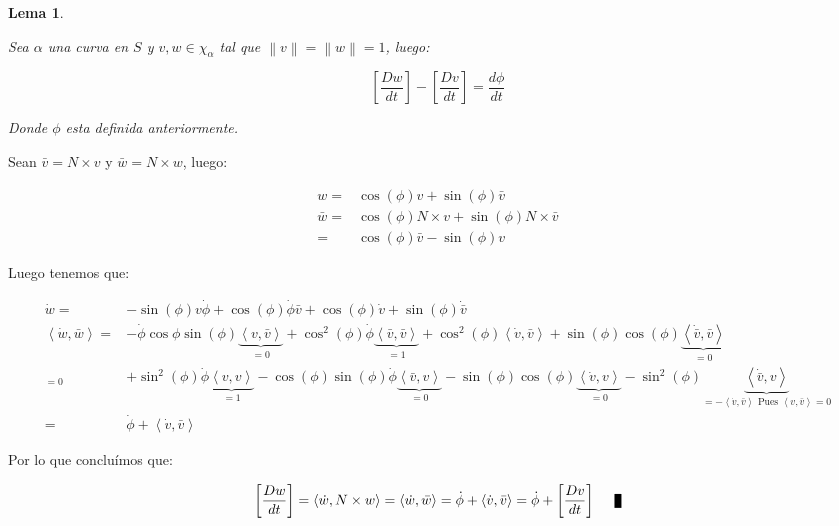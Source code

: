 \documentclass[11pt]{article}
\newcommand\norm[1]{\left\lVert#1\right\rVert}
\newcommand\ip[1]{\left\langle#1\right\rangle}
\newtheorem{lemma}[theorem]{Lema}
\newenvironment{proof}[1][Demostraci\'on]{\begin{trivlist}
		\item[\hskip \labelsep {\bfseries #1}]}{\end{trivlist}}
\newcommand{\qed}{\nobreak \ifvmode \relax \else
	\ifdim\lastskip<1.5em \hskip-\lastskip
	\hskip1.5em plus0em minus0.5em \fi \nobreak
	\vrule height0.75em width0.5em depth0.25em\fi}
\begin{document}
\begin{lemma}
	\label{Derivada covariante y angulo}
	
	Sea $\alpha$ una curva en $S$ y $v,w \in \chi_{\alpha}$ tal que $\norm{v} = \norm{w} = 1$, luego:
	
	\begin{equation*}
		\left[\dfrac{Dw}{dt}\right] - \left[\dfrac{Dv}{dt}\right] = \dfrac{d\phi}{dt}
	\end{equation*}
	
	Donde $\phi$ esta definida anteriormente.
	
\end{lemma}

\begin{proof}
	
	Sean $\bar{v} = N \times v$ y $\bar{w} = N \times w$, luego:
	
	\begin{equation*}
		\begin{aligned}
			w = & \cos(\phi)v + \sin(\phi) \bar{v} \\
			\bar{w} = & \cos(\phi)N \times v + \sin(\phi) N \times \bar{v} \\
			= & \cos(\phi) \bar{v} - \sin(\phi) v 
		\end{aligned}
	\end{equation*}
	
	Luego tenemos que:
	
	\begin{equation*}
	\begin{aligned}
		\dot{w} = & - \sin(\phi)v \dot{\phi} + \cos(\phi) \dot{\phi}\bar{v} + \cos(\phi)\dot{v} + \sin(\phi) \dot{\bar{v}} \\
		\ip{\dot{w},\bar{w}} = & -\dot{\phi} \cos{\phi} \sin(\phi) \underbrace{\ip{v,\bar{v}}}_{= 0} + \cos^2(\phi) \dot{\phi} \underbrace{\ip{\bar{v}, \bar{v}}}_{= 1}  + \cos^2(\phi) \ip{\dot{v}, \bar{v}} + \sin(\phi)\cos(\phi) \underbrace{\ip{\dot{\bar{v}}, \bar{v}}}_{= 0}  \\_{= 0} 
		& + \sin^2(\phi) \dot{\phi}  \underbrace{\ip{v,v} }_{= 1} - \cos(\phi)\sin(\phi) \dot{\phi} \underbrace{\ip{\bar{v},v} }_{=0}- \sin(\phi)\cos(\phi) \underbrace{\ip{\dot{v},v} }_{= 0} - \sin^2(\phi) \underbrace{\ip{\dot{\bar{v}},v}}_{ = -\ip{\dot{v},\bar{v}} \text{ Pues } \ip{v, \bar{v}} = 0} \\
		= & \dot{\phi} + \ip{\dot{v},\bar{v}}
	\end{aligned}
	\end{equation*}
	
	Por lo que conclu\'imos que:
	
	\begin{equation*}
	 \left[\dfrac{Dw}{dt}\right] = \ip{\dot{w} , N \times w} = \ip{\dot{w}, \bar{w}} = \dot{\phi} + \ip{\dot{v},\bar{v}} = \dot{\phi} + \left[\dfrac{Dv}{dt}\right] \qed
	\end{equation*}
	
\end{proof}
\end{document}
